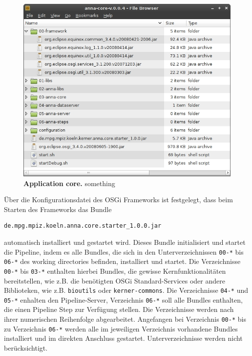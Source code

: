 \begin{figure}[ht]
	\begin{center}
		\includegraphics[scale=0.68]{pics/anna_folder_framework.jpg}
	\caption[Application core]{
	\textbf{Application core.}
	something}
	\end{center}
	\label{fig:anna_folder_framework}
\end{figure}

Über die Konfigurationsdatei des OSGi Frameworks ist festgelegt, dass beim
Starten des Frameworks das Bundle
\begin{verbatim}de.mpg.mpiz.koeln.anna.core.starter_1.0.0.jar\end{verbatim}
automatisch installiert und gestartet wird. Dieses Bundle initialisiert und
startet die Pipeline, indem es alle Bundles, die sich in den Unterverzeichnissen
\texttt{00-*} bis \texttt{06-*} des working directories befinden, installiert
und startet. Die Verzeichnisse \texttt{00-*} bis \texttt{03-*} enthalten
hierbei Bundles, die gewisse Kernfunktionalitäten bereitstellen, wie z.B. die
benötigten OSGi Standard-Services oder andere Biblioteken, wie z.B.
\texttt{bioutils} oder \texttt{kerner-commons}.
Die Verzeichnisse \texttt{04-*} und \texttt{05-*} enhalten den
Pipeline-Server, Verzeichnis \texttt{06-*} soll alle Bundles enthalten, die
einen Pipeline Step zur Verfügung stellen.
Die Verzeichnisse werden nach ihrer numerischen Reihenfolge abgearbeitet.
Angefangen bei Verzeichnis \texttt{00-*} bis zu Verzeichnis \texttt{06-*} werden
alle im jeweiligen Verzeichnis vorhandene Bundles installiert und im direkten
Anschluss gestartet. Unterverzeichnisse werden nicht berücksichtigt.

